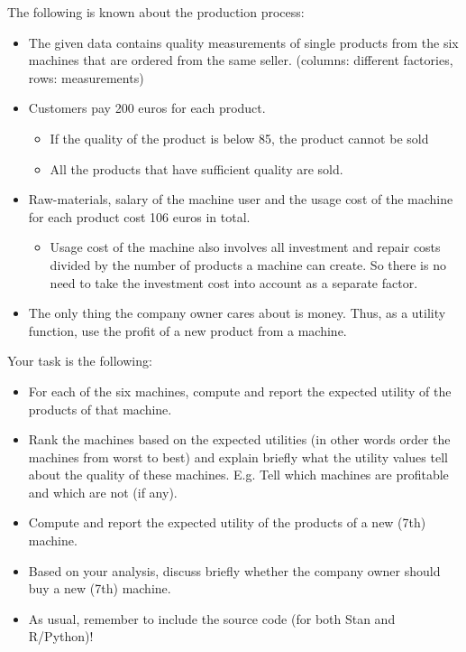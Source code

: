 \documentclass[a4paper,11pt]{article}
\begin{document}
The following is known about the production process: 
\begin{itemize} 
\item The given data contains quality measurements of single products from the six machines that are ordered from the same seller. (columns: different factories, rows: measurements)
\item Customers pay 200 euros for each product.
\begin{itemize}
\item If the quality of the product is below 85, the product cannot be sold 
\item All the products that have sufficient quality are sold.
\end{itemize}
\item Raw-materials, salary of the machine user and the usage cost of the machine for each product cost 106 euros in total.
\begin{itemize}
\item Usage cost of the machine also involves all investment and repair costs divided by the number of products a machine can create. So there is no need to take the investment cost into account as a separate factor.
\end{itemize}
\item The only thing the company owner cares  about is money. Thus, as a utility function, use the profit of a new product from a machine.
\end{itemize}

Your task is the following:
\begin{itemize}
\item For each of the six machines, compute and report the expected utility of the products of that machine.
\item Rank the machines based on the expected utilities (in other words order the machines from worst to best) and explain briefly what the utility values tell about the quality of these machines. E.g. Tell which machines are profitable and which are not (if any).
\item Compute and report the expected utility of the products of a new (7th) machine.
\item Based on your analysis, discuss briefly whether the company owner should buy a new (7th) machine.
\item As usual, remember to include the source code (for both Stan and R/Python)!
\end{itemize}
\end{document}
